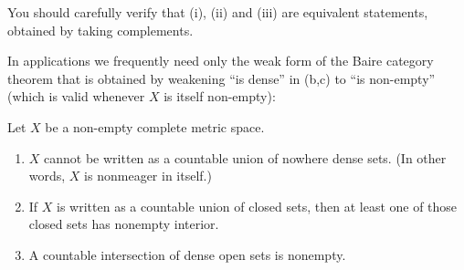 You should carefully verify that (i), (ii) and (iii) are equivalent statements, obtained by taking complements.

In applications we frequently need only the weak form of the Baire category theorem that is obtained by weakening ``is dense'' in (b,c) to ``is non-empty'' (which is valid whenever $X$ is itself non-empty):

\begin{corollary}
Let $X$ be a non-empty complete metric space.
\begin{enumerate}[label=(\roman*)]
\item $X$ cannot be written as a countable union of nowhere dense sets. (In other words, $X$ is nonmeager in itself.)
\item If $X$ is written as a countable union of closed sets, then at least one of those closed sets has nonempty interior.
\item A countable intersection of dense open sets is nonempty.
\end{enumerate}
\end{corollary}

\pagebreak

